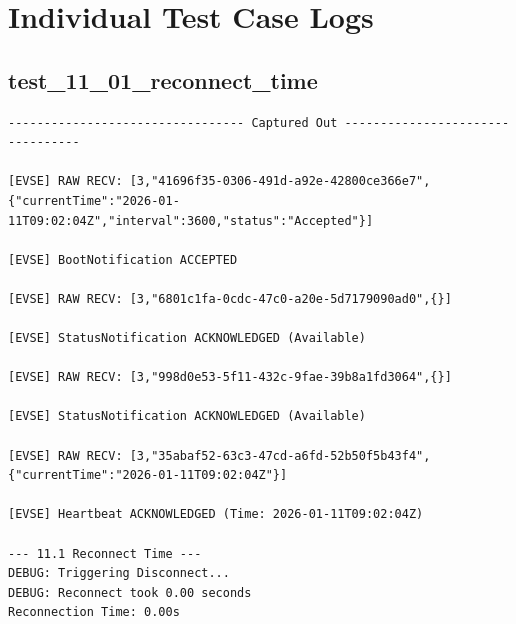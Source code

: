 \documentclass{article}
\begin{document}
\section{Individual Test Case Logs}\subsection*{test\_11\_01\_reconnect\_time}
\begin{lstlisting}
--------------------------------- Captured Out ---------------------------------

[EVSE] RAW RECV: [3,"41696f35-0306-491d-a92e-42800ce366e7",{"currentTime":"2026-01-11T09:02:04Z","interval":3600,"status":"Accepted"}]

[EVSE] BootNotification ACCEPTED

[EVSE] RAW RECV: [3,"6801c1fa-0cdc-47c0-a20e-5d7179090ad0",{}]

[EVSE] StatusNotification ACKNOWLEDGED (Available)

[EVSE] RAW RECV: [3,"998d0e53-5f11-432c-9fae-39b8a1fd3064",{}]

[EVSE] StatusNotification ACKNOWLEDGED (Available)

[EVSE] RAW RECV: [3,"35abaf52-63c3-47cd-a6fd-52b50f5b43f4",{"currentTime":"2026-01-11T09:02:04Z"}]

[EVSE] Heartbeat ACKNOWLEDGED (Time: 2026-01-11T09:02:04Z)

--- 11.1 Reconnect Time ---
DEBUG: Triggering Disconnect...
DEBUG: Reconnect took 0.00 seconds
Reconnection Time: 0.00s
\end{lstlisting}
\end{document}
